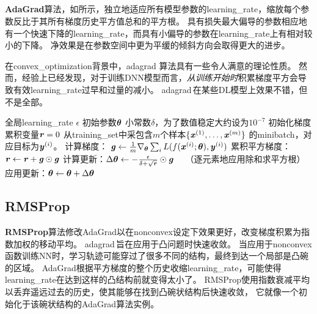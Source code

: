 \subsection{}
\label{sec:adagrad}
\textbf{AdaGrad}算法，如所示，独立地适应所有模型参数的\gls{learning_rate}，缩放每个参数反比于其所有梯度历史平方值总和的平方根\citep{Duchi+al-2011}。
具有损失最大偏导的参数相应地有一个快速下降的\gls{learning_rate}，而具有小偏导的参数在\gls{learning_rate}上有相对较小的下降。
净效果是在参数空间中更为平缓的倾斜方向会取得更大的进步。


在\gls{convex_optimization}背景中，\gls{adagrad} 算法具有一些令人满意的理论性质。
然而，经验上已经发现，对于训练\gls{DNN}模型而言，\emph{从训练开始时}积累梯度平方会导致有效\gls{learning_rate}过早和过量的减小。
\gls{adagrad}\,在某些\gls{DL}模型上效果不错，但不是全部。


\begin{algorithm}[ht]
\caption{AdaGrad算法}
\label{alg:ada_grad}
\begin{algorithmic}
\REQUIRE 全局\gls{learning_rate} $\epsilon$
\REQUIRE 初始参数$\boldsymbol{\theta}$
\REQUIRE 小常数$\delta$，为了数值稳定大约设为$10^{-7}$
\STATE 初始化梯度累积变量$\boldsymbol{\mathit{r}} = 0$
    \STATE 从\gls{training_set}中采包含$m$个样本$\{ \boldsymbol{\mathit{x}}^{(1)},\dots, \boldsymbol{\mathit{x}}^{(m)}\}$ 的\gls{minibatch}，对应目标为$\boldsymbol{\mathit{y}}^{(i)}$。
    \STATE 计算梯度： $\boldsymbol{\mathit{g}} \leftarrow  
         \frac{1}{m} \nabla_{\boldsymbol{\theta}} \sum_i L(f(\boldsymbol{\mathit{x}}^{(i)};\boldsymbol{\theta}),\boldsymbol{\mathit{y}}^{(i)})$ 
    \STATE 累积平方梯度：$\boldsymbol{\mathit{r}} \leftarrow \boldsymbol{\mathit{r}} + \boldsymbol{\mathit{g}} \odot \boldsymbol{\mathit{g}}$
    \STATE 计算更新：$\Delta \boldsymbol{\theta} \leftarrow -
    \frac{\epsilon}{\delta+ \sqrt{\boldsymbol{\mathit{r}}}} \odot\boldsymbol{\mathit{g}}$  \ \  （逐元素地应用除和求平方根）
    \STATE 应用更新：$\boldsymbol{\theta} \leftarrow \boldsymbol{\theta} + \Delta \boldsymbol{\theta}$
\ENDWHILE
\end{algorithmic}
\end{algorithm}


\subsection{RMSProp}
\label{sec:rmsprop}
\textbf{RMSProp}算法\citep{Hinton-ipam2012}修改AdaGrad以在\gls{nonconvex}设定下效果更好，改变梯度积累为指数加权的移动平均。
\gls{adagrad}\,旨在应用于凸问题时快速收敛。
当应用于\gls{nonconvex}函数训练\gls{NN}时，学习轨迹可能穿过了很多不同的结构，最终到达一个局部是凸碗的区域。
AdaGrad根据平方梯度的整个历史收缩\gls{learning_rate}，可能使得\gls{learning_rate}在达到这样的凸结构前就变得太小了。
RMSProp使用指数衰减平均以丢弃遥远过去的历史，使其能够在找到凸碗状结构后快速收敛，
它就像一个初始化于该碗状结构的AdaGrad算法实例。

